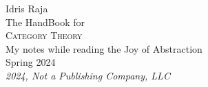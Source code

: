 \begin{titlepage}
  \raggedleft
  {\Large Idris Raja\\[1in]}
  {\large The HandBook for\\}
  {\Huge\scshape Category Theory\\[.2in]}
  {\large My notes while reading the Joy of Abstraction\\}
  {\large Spring 2024\\}
  \vfill
    {\itshape 2024, Not a Publishing Company, LLC}
\end{titlepage}
